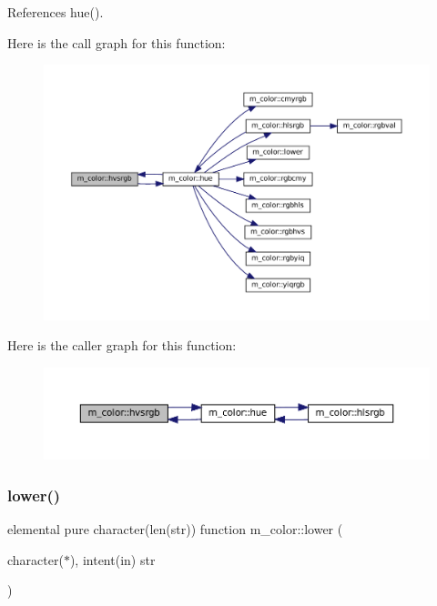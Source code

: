 References hue().

Here is the call graph for this function\+:\nopagebreak
\begin{figure}[H]
\begin{center}
\leavevmode
\includegraphics[width=350pt]{namespacem__color_a334ec90d94bbfb9a4c08c5f9efdb8c47_cgraph}
\end{center}
\end{figure}
Here is the caller graph for this function\+:\nopagebreak
\begin{figure}[H]
\begin{center}
\leavevmode
\includegraphics[width=350pt]{namespacem__color_a334ec90d94bbfb9a4c08c5f9efdb8c47_icgraph}
\end{center}
\end{figure}
\mbox{\label{namespacem__color_a704e93b42d777a827ec557c92d2dd7dc}} 
\subsubsection{\texorpdfstring{lower()}{lower()}}
{\footnotesize\ttfamily elemental pure character(len(str)) function m\+\_\+color\+::lower (\begin{DoxyParamCaption}\item[{character($\ast$), intent(in)}]{str }\end{DoxyParamCaption})\hspace{0.3cm}{\ttfamily [private]}}

